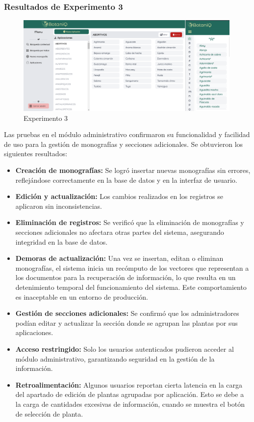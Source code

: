 \subsubsection*{Resultados de Experimento 3}
\begin{figure}[ht!]
    \centering
    \includegraphics[width=0.99\textwidth]{Images/exp3.png}
    \caption{Experimento 3}
    \label{fig:exp3}
\end{figure}
Las pruebas en el módulo administrativo confirmaron su funcionalidad y facilidad de uso para la gestión de monografías y secciones adicionales. 
Se obtuvieron los siguientes resultados:
\begin{itemize}
    \item \textbf{Creación de monografías:} Se logró insertar nuevas monografías sin errores, reflejándose correctamente en la base de datos 
    y en la interfaz de usuario.
    \item \textbf{Edición y actualización:} Los cambios realizados en los registros se aplicaron sin inconsistencias.
    \item \textbf{Eliminación de registros:} Se verificó que la eliminación de monografías y secciones adicionales no afectara otras partes 
    del sistema, asegurando integridad en la base de datos.
    \item \textbf{Demoras de actualización:} Una vez se insertan, editan o eliminan monografías, el sistema inicia un recómputo de los 
    vectores que representan a los documentos para la recuperación de información, lo que resulta en un detenimiento temporal del funcionamiento
    del sistema. Este comportamiento es inaceptable en un entorno de producción.
    \item \textbf{Gestión de secciones adicionales:} Se confirmó que los administradores podían editar y actualizar la sección donde se agrupan
    las plantas por sus aplicaciones.
    \item \textbf{Acceso restringido:} Solo los usuarios autenticados pudieron acceder al módulo administrativo, garantizando seguridad en la 
    gestión de la información.
    \item \textbf{Retroalimentación:} Algunos usuarios reportan cierta latencia en la carga del apartado de edición de plantas agrupadas por
    aplicación. Esto se debe a la carga de cantidades excesivas de información, cuando se muestra el botón de selección de planta.
\end{itemize}
